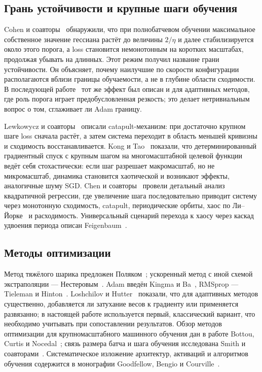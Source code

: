 \subsection{Грань устойчивости и крупные шаги обучения}

Cohen и соавторы~\cite{cohen2021} обнаружили, что при полнобатчевом обучении
максимальное собственное значение гессиана растёт до величины $2/\eta$ и далее
стабилизируется около этого порога, а loss становится немонотонным на коротких
масштабах, продолжая убывать на длинных. Этот режим получил название грани
устойчивости. Он объясняет, почему наилучшие по скорости конфигурации
располагаются вблизи границы обучаемости, а не в глубине области сходимости.
В последующей работе~\cite{cohen2022} тот же эффект был описан и для адаптивных
методов, где роль порога играет предобусловленная резкость; это делает
нетривиальным вопрос о том, сглаживает ли Adam границу.

Lewkowycz и соавторы~\cite{lewkowycz2020} описали catapult-механизм: при
достаточно крупном шаге loss сначала растёт, а затем система переходит в
область меньшей кривизны и сходимость восстанавливается. Kong и
Tao~\cite{kong2020} показали, что детерминированный градиентный спуск с крупным
шагом на многомасштабной целевой функции ведёт себя стохастически: если шаг
разрешает макромасштаб, но не микромасштаб, динамика становится хаотической и
возникают эффекты, аналогичные шуму SGD. Chen и соавторы~\cite{chen2023}
провели детальный анализ квадратичной регрессии, где увеличение шага
последовательно приводит систему через монотонную сходимость, catapult,
периодические орбиты, хаос по Ли--Йорке~\cite{liyorke1975} и расходимость.
Универсальный сценарий перехода к хаосу через каскад удвоения периода описан
Feigenbaum~\cite{feigenbaum1978}.

\subsection{Методы оптимизации}

Метод тяжёлого шарика предложен Поляком~\cite{polyak1964}; ускоренный метод
с иной схемой экстраполяции --- Нестеровым~\cite{nesterov1983}. Adam введён
Kingma и Ba~\cite{kingma2015}, RMSprop --- Tieleman и
Hinton~\cite{tieleman2012}. Loshchilov и Hutter~\cite{loshchilov2019} показали,
что для адаптивных методов существенно, добавляется ли затухание весов к
градиенту или применяется развязанно; в настоящей работе используется первый,
классический вариант, что необходимо учитывать при сопоставлении результатов.
Обзор методов оптимизации для крупномасштабного машинного обучения дан в
работе Bottou, Curtis и Nocedal~\cite{bottou2018}; связь размера батча и шага
обучения исследована Smith и соавторами~\cite{smith2018}. Систематическое
изложение архитектур, активаций и алгоритмов обучения содержится в
монографии Goodfellow, Bengio и Courville~\cite{goodfellow2016}.

